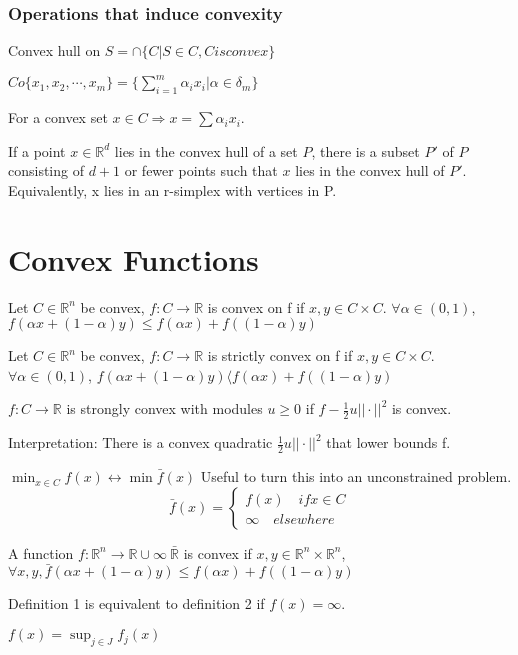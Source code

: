 \documentclass[11pt,fleqn]{book} %
\def\R{\mathbb{R}}
\begin{document}
\begin{CJK}{UTF8}{gkai}
\subsubsection{Operations that induce convexity}
Convex hull on $S = \cap \{C | S\in C, C is convex\}$\\
\begin{example}
$Co \{ x_1,x_2,\cdots,x_m\} = \{ \sum_{i=1}^m \alpha_i x_i | \alpha \in \delta_m \}$
\end{example}
For a convex set $x \in C \Rightarrow x = \sum \alpha_i x_i$. 
\begin{theorem}
If a point $x \in \R^d$ lies in the convex hull of a set $P$, there is a subset $P'$ of $P$ consisting of $d + 1$ or fewer points such that $x$ lies in the convex hull of $P'$. Equivalently, x lies in an r-simplex with vertices in P.
\end{theorem}

\section{Convex Functions}
\begin{definition}
Let $C \in \R^n$ be convex, $f:C \to \R$ is convex on f if $x,y \in C \times C$. $\forall \alpha \in (0,1)$, $f(\alpha x + (1-\alpha) y) \le f(\alpha x) + f((1-\alpha) y)$
\end{definition}

\begin{definition}
Let $C \in \R^n$ be convex, $f:C \to \R$ is strictly convex on f if $x,y \in C \times C$. $\forall \alpha \in (0,1)$, $f(\alpha x + (1-\alpha) y) \langle f(\alpha x) + f((1-\alpha) y)$
\end{definition}

\begin{definition}
$f:C \to \R$ is strongly convex with modules $u \ge 0$ if $f - \frac{1}{2}u || \cdot ||^2$ is convex.
\end{definition}
Interpretation: There is a convex quadratic $\frac{1}{2}u || \cdot ||^2$ that lower bounds f.
\begin{example}
$\min_{x \in C} f(x) \leftrightarrow \min \bar{f}(x)$
Useful to turn this into an unconstrained problem. \\
$$\bar{f}(x) = \begin{cases}
f(x) \quad if x \in C \\
\infty \quad  elsewhere
\end{cases}$$
\end{example}
\begin{definition}
A function $f : \R^n \to \R \cup \infty \ \bar{\R}$ is convex if $x,y \in \R^n \times \R^n$, $\forall x,y , \bar{f}(\alpha x + (1-\alpha) y) \le f(\alpha x) + f((1-\alpha) y)$
\end{definition}
Definition 1 is equivalent to definition 2 if $f(x) = \infty$.
\begin{example}
$f(x) = \sup_{j \in J} f_j(x)$
\end{example}


\end{CJK}
\end{document}
